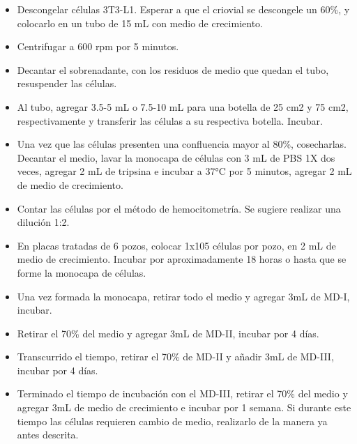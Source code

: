 \documentclass[
  spanish,
  12pt,
  a4paper,
]{article}
\providecommand{\tightlist}{%
  \setlength{\itemsep}{0pt}\setlength{\parskip}{0pt}}
\begin{document}
\begin{tcolorbox}[enhanced jigsaw, arc=.35mm, bottomrule=.15mm, bottomtitle=1mm, breakable, colback=white, colbacktitle=quarto-callout-note-color!10!white, colframe=quarto-callout-note-color-frame, coltitle=black, left=2mm, leftrule=.75mm, opacityback=0, opacitybacktitle=0.6, rightrule=.15mm, title=\textcolor{quarto-callout-note-color}{\faInfo}\hspace{0.5em}{Pasos}, titlerule=0mm, toprule=.15mm, toptitle=1mm]

\begin{itemize}
\tightlist
\item
  Descongelar células 3T3-L1. Esperar a que el criovial se descongele un
  60\%, y colocarlo en un tubo de 15 mL con medio de crecimiento.
\item
  Centrifugar a 600 rpm por 5 minutos.
\item
  Decantar el sobrenadante, con los residuos de medio que quedan el
  tubo, resuspender las células.
\item
  Al tubo, agregar 3.5-5 mL o 7.5-10 mL para una botella de 25 cm2 y 75
  cm2, respectivamente y transferir las células a su respectiva botella.
  Incubar.
\item
  Una vez que las células presenten una confluencia mayor al 80\%,
  cosecharlas. Decantar el medio, lavar la monocapa de células con 3 mL
  de PBS 1X dos veces, agregar 2 mL de tripsina e incubar a 37°C por 5
  minutos, agregar 2 mL de medio de crecimiento.
\item
  Contar las células por el método de hemocitometría. Se sugiere
  realizar una dilución 1:2.
\item
  En placas tratadas de 6 pozos, colocar 1x105 células por pozo, en 2 mL
  de medio de crecimiento. Incubar por aproximadamente 18 horas o hasta
  que se forme la monocapa de células.
\item
  Una vez formada la monocapa, retirar todo el medio y agregar 3mL de
  MD-I, incubar.
\item
  Retirar el 70\% del medio y agregar 3mL de MD-II, incubar por 4 días.
\item
  Transcurrido el tiempo, retirar el 70\% de MD-II y añadir 3mL de
  MD-III, incubar por 4 días.
\item
  Terminado el tiempo de incubación con el MD-III, retirar el 70\% del
  medio y agregar 3mL de medio de crecimiento e incubar por 1 semana. Si
  durante este tiempo las células requieren cambio de medio, realizarlo
  de la manera ya antes descrita.
\end{itemize}

\end{tcolorbox}
\end{document}

